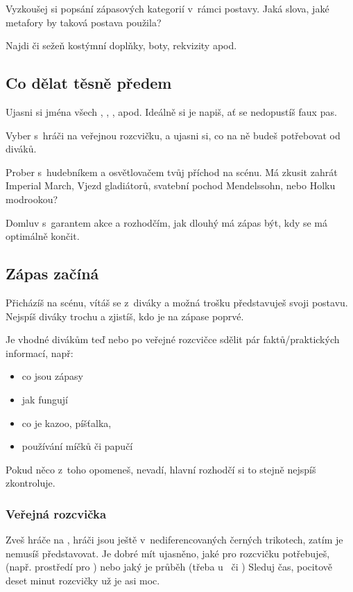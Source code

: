 Vyzkoušej si popsání zápasových kategorií v~rámci postavy. Jaká slova, jaké metafory by taková postava použila?  
 
Najdi či sežeň kostýmní doplňky, boty, rekvizity apod. 
 
\subsection{ Co dělat těsně předem } Ujasni si jména všech , , ,  apod. Ideálně si je napiš, ať se nedopustíš faux pas. 
 
Vyber s~hráči  na veřejnou rozcvičku, a ujasni si, co na ně budeš potřebovat od diváků. 
 
Prober s~hudebníkem a osvětlovačem tvůj příchod na scénu. Má zkusit zahrát Imperial March, Vjezd gladiátorů, svatební pochod Mendelssohn, nebo Holku modrookou? 
 
Domluv s~garantem akce a rozhodčím, jak dlouhý má zápas být, kdy se má optimálně končit. 
 
\subsection{Zápas začíná} Přicházíš na scénu, vítáš se z~diváky a možná trošku představuješ svoji postavu. 
Nejspíš diváky trochu  a zjistíš, kdo je na zápase poprvé. 
 
Je vhodné divákům teď nebo po veřejné rozcvičce sdělit pár faktů/praktických  informací, např: 
\begin{itemize}
\item  co jsou zápasy
\item  jak fungují 
\item  co je kazoo, píšťalka, 
\item  používání  míčků či papučí
\end{itemize}
 
Pokud něco z~toho opomeneš, nevadí, hlavní rozhodčí si to stejně nejspíš zkontroluje. 
 
\subsubsection{ Veřejná rozcvička } Zveš hráče na  , hráči jsou ještě v~nediferencovaných černých trikotech, zatím je nemusíš představovat.  
Je dobré mít ujasněno, jaké  pro rozcvičku potřebuješ, (např. prostředí pro ) nebo jaký je průběh (třeba u~ či  ) 
Sleduj čas, pocitově deset minut rozcvičky už je asi moc. 
 
